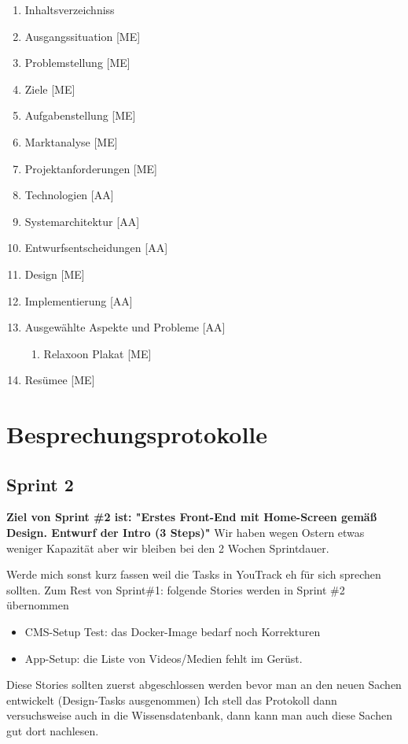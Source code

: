 \begin{enumerate}
    \item Inhaltsverzeichniss
    \item Ausgangssituation [ME]
    \item Problemstellung [ME]
    \item Ziele [ME]
    \item Aufgabenstellung [ME]
    \item Marktanalyse [ME]
    \item Projektanforderungen [ME]
    \item Technologien [AA]
    \item Systemarchitektur [AA]
    \item Entwurfsentscheidungen [AA]
    \item Design [ME]
    \item Implementierung [AA]
    \item Ausgewählte Aspekte und Probleme [AA]
          \begin{enumerate}
              \item Relaxoon Plakat [ME]
          \end{enumerate}
    \item Resümee [ME]
\end{enumerate}

\section{Besprechungsprotokolle}

\subsection{Sprint 2}
\textbf{Ziel von Sprint \#2 ist: "Erstes Front-End mit Home-Screen gemäß Design. Entwurf der Intro (3 Steps)"}
Wir haben wegen Ostern etwas weniger Kapazität aber wir bleiben bei den 2 Wochen Sprintdauer.

Werde mich sonst kurz fassen weil die Tasks in YouTrack eh für sich sprechen sollten.
Zum Rest von Sprint\#1: folgende Stories werden in Sprint \#2 übernommen
\begin{itemize}
    \item CMS-Setup Test: das Docker-Image bedarf noch Korrekturen
    \item App-Setup: die Liste von Videos/Medien fehlt im Gerüst.
\end{itemize}


Diese Stories sollten zuerst abgeschlossen werden bevor man an den neuen Sachen entwickelt (Design-Tasks ausgenommen)
Ich stell das Protokoll dann versuchsweise auch in die Wissensdatenbank, dann kann man auch diese Sachen gut dort nachlesen.

